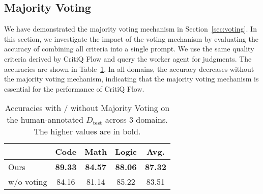 \subsection{Majority Voting}

We have demonstrated the majority voting mechanism in Section~\ref{sec:voting}. In
this section, we investigate the impact of the voting mechanism by evaluating
the accuracy of combining all criteria into a single prompt. We use the same quality
criteria derived by CritiQ Flow and query the worker agent for judgments. The
accuracies are shown in Table~\ref{tab:majority_voting}. In all domains, the
accuracy decreases without the majority voting mechanism, indicating that the majority
voting mechanism is essential for the performance of CritiQ Flow.

\begin{table}[htbp]
    \centering
    \begin{tabular}{lcccc}
        \toprule      & \textbf{Code} & \textbf{Math} & \textbf{Logic} & \textbf{Avg.} \\
        \midrule Ours & \textbf{89.33}         & \textbf{84.57}         & \textbf{88.06}          & \textbf{87.32}         \\
        w/o voting    & 84.16         & 81.14         & 85.22          & 83.51         \\
        \bottomrule
    \end{tabular}
    \caption{Accuracies with / without Majority Voting on the human-annotated
    $D_{\text{test}}$ across 3 domains. The higher values are in bold.}
    \label{tab:majority_voting}
\end{table}